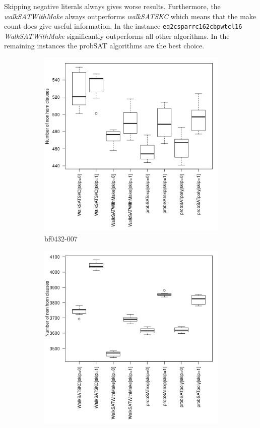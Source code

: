 \documentclass[12pt,a4paper]{article}
\begin{document}
Skipping negative literals always gives worse results. Furthermore, the \textit{walkSATWithMake} always outperforms \textit{walkSATSKC} which means that the make count does give useful information. In the instance \texttt{eq2csparrc162cbpwtcl16} \textit{WalkSATWithMake} significantly outperforms all other algorithms. In the remaining instances the probSAT algorithms are the best choice.
\begin{figure}[H]
  \centering
  \begin{subfigure}{0.4\textwidth}
    \includegraphics[width=\textwidth]{boxplots/boxPlotbf0432-007.png}
    \caption{bf0432-007}
  \end{subfigure}
  \begin{subfigure}{0.4\textwidth}
    \includegraphics[width=\textwidth]{boxplots/boxPloteq2csparrc162cbpwtcl16.png}

\end{subfigure}
\end{figure}
\end{document}
